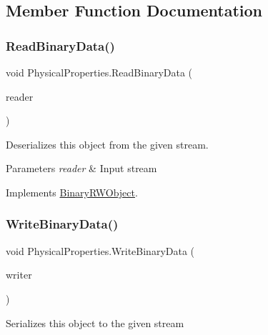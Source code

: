 \subsection{Member Function Documentation}
\mbox{\label{class_physical_properties_a9d38ac741d7aae550b0adb7f48d09ad9}} 
\subsubsection{\texorpdfstring{Read\+Binary\+Data()}{ReadBinaryData()}}
{\footnotesize\ttfamily void Physical\+Properties.\+Read\+Binary\+Data (\begin{DoxyParamCaption}\item[{Binary\+Reader}]{reader }\end{DoxyParamCaption})}



Deserializes this object from the given stream. 


\begin{DoxyParams}{Parameters}
{\em reader} & Input stream\\
\hline
\end{DoxyParams}


Implements \hyperlink{interface_binary_r_w_object_a2cd7d6b9aded677cffdb646b51328c5d}{Binary\+R\+W\+Object}.

\mbox{\label{class_physical_properties_afcdfb13e380a0b9870af47fb7785d4de}} 
\subsubsection{\texorpdfstring{Write\+Binary\+Data()}{WriteBinaryData()}}
{\footnotesize\ttfamily void Physical\+Properties.\+Write\+Binary\+Data (\begin{DoxyParamCaption}\item[{Binary\+Writer}]{writer }\end{DoxyParamCaption})}



Serializes this object to the given stream 


